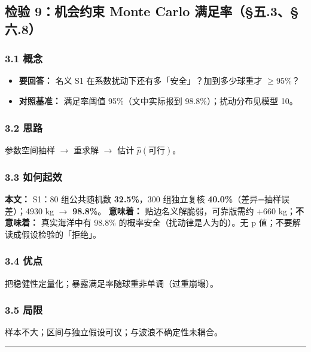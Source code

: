 \documentclass[UTF8,a4paper,zihao=-4]{ctexart}
\begin{document}
\subsection{\texorpdfstring{检验 9：机会约束 Monte Carlo 满足率（§五.3、§六.8）}{检验 9：机会约束 Monte Carlo 满足率（§五.3、§六.8）}}

\subsubsection{\texorpdfstring{3.1 概念}{3.1 概念}}
\begin{itemize}[leftmargin=1.5em]
\item \textbf{要回答：} 名义 S1 在系数扰动下还有多「安全」？加到多少球重才 $\ge$95\%？
\item \textbf{对照基准：} 满足率阈值 95\%（文中实际报到 98.8\%）；扰动分布见模型 10。
\end{itemize}

\subsubsection{\texorpdfstring{3.2 思路}{3.2 思路}}
参数空间抽样 $\rightarrow$ 重求解 $\rightarrow$ 估计 \(\widehat{p}(\text{可行})\)。

\subsubsection{\texorpdfstring{3.3 如何起效}{3.3 如何起效}}
\textbf{本文：} S1：80 组公共随机数 \textbf{32.5\%}，300 组独立复核 \textbf{40.0\%}（差异=抽样误差）；4930 kg $\rightarrow$ \textbf{98.8\%}。  
\textbf{意味着：} 贴边名义解脆弱，可靠版需约 +660 kg；\textbf{不意味着：} 真实海洋中有 98.8\% 的概率安全（扰动律是人为的）。无 p 值；不要解读成假设检验的「拒绝」。

\subsubsection{\texorpdfstring{3.4 优点}{3.4 优点}}
把稳健性定量化；暴露满足率随球重非单调（过重崩塌）。

\subsubsection{\texorpdfstring{3.5 局限}{3.5 局限}}
样本不大；区间与独立假设可议；与波浪不确定性未耦合。

\vspace{0.4em}\hrule\vspace{0.4em}
\end{document}
